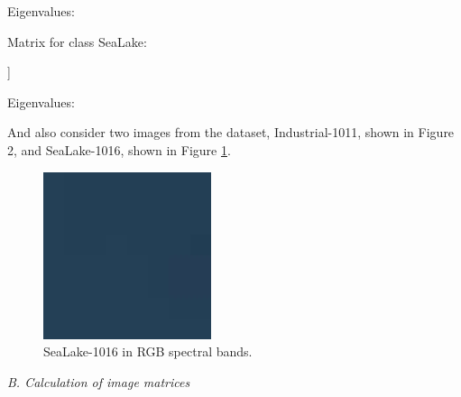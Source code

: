 \documentclass{article}
\begin{document}
\begin{multicols*}{2}
\noindent Eigenvalues: 
\par [5.568 1.259 0.627 0.218 0.015 0.066 0.136 0.112] 
\vspace{10pt}

\noindent Matrix for class SeaLake: 
\par [[1. 0.492 0.446 0.366 0.27 0.23 0.295 0.289]
\par [0.492 1. 0.477 0.408 0.32 0.26 0.329 0.296] 
\par [0.446 0.477 1. 0.532 0.418 0.394 0.402 0.373] 
\par [0.366 0.408 0.532 1. 0.583 0.552 0.537 0.501] 
\par [0.27 0.32 0.418 0.583 1. 0.582 0.585 0.519]
\par [0.23 0.26 0.394 0.552 0.582 1. 0.54 0.482] 
\par [0.295 0.329 0.402 0.537 0.585 0.54 1. 0.561] 
\par [0.289 0.296 0.373 0.501 0.519 0.482 0.561 1. ]] 
\vspace{10pt}

\noindent Eigenvalues: 
\par [4.047 1.147 0.589 0.506 0.492 0.383 0.413 0.425] 
\vspace{20pt}

\par And also consider two images from the dataset,
Industrial-1011, shown in Figure 2, and SeaLake-1016,
shown in Figure \ref{figure6}.

\begin{figure}[H]
    \centering
    \includegraphics[width=0.5\linewidth]{img6}
    \caption{\small \centering SeaLake-1016 in RGB spectral bands. \label{figure6}}
\end{figure} 

\noindent \textit{B. Calculation of image matrices} 
\vspace{5pt}


\end{multicols*}
\end{document}
